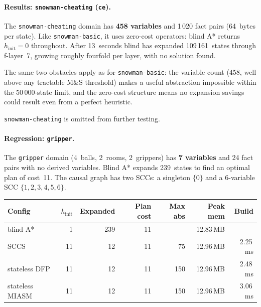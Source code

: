 \documentclass[11pt,a4paper]{article}
\begin{document}
\paragraph{Results: \texttt{snowman-cheating} (\texttt{ce}).}

The \texttt{snowman-cheating} domain has \textbf{458 variables} and 1\,020
fact pairs (64~bytes per state).
Like \texttt{snowman-basic}, it uses zero-cost operators:
blind A* returns $h_{\mathrm{init}} = 0$ throughout.
After 13~seconds blind has expanded 109\,161~states through f-layer~7,
growing roughly fourfold per layer, with no solution found.

The same two obstacles apply as for \texttt{snowman-basic}: the variable
count (458, well above any tractable M\&S threshold) makes a useful
abstraction impossible within the 50\,000-state limit, and the zero-cost
structure means no expansion savings could result even from a perfect
heuristic.

\texttt{snowman-cheating} is omitted from further testing.

\paragraph{Regression: \texttt{gripper}.}

The \texttt{gripper} domain (4~balls, 2~rooms, 2~grippers) has \textbf{7
variables} and 24 fact pairs with no derived variables.
Blind A* expands 239~states to find an optimal plan of cost~11.
The causal graph has two SCCs: a singleton $\{0\}$ and a 6-variable SCC
$\{1,2,3,4,5,6\}$.

\begin{center}
\small
\begin{tabular}{lrrrrrr}
\toprule
\textbf{Config} & \textbf{$h_{\mathrm{init}}$} & \textbf{Expanded}
  & \textbf{Plan cost} & \textbf{Max abs} & \textbf{Peak mem} & \textbf{Build} \\
\midrule
blind A*            &  1 & 239 & 11 & --- & 12.83\,MB & ---     \\
SCCS                & 11 &  12 & 11 &  75 & 12.96\,MB & 2.25\,ms \\
stateless DFP       & 11 &  12 & 11 & 150 & 12.96\,MB & 2.48\,ms \\
stateless MIASM     & 11 &  12 & 11 & 150 & 12.96\,MB & 3.06\,ms \\
\bottomrule
\end{tabular}
\end{center}
\end{document}
